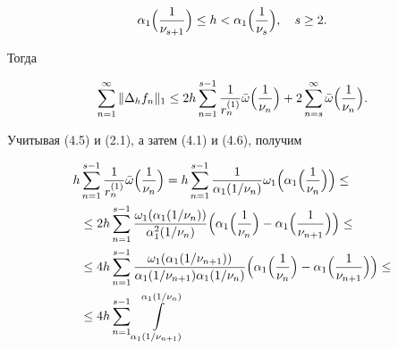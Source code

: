 \begin{pf}
\begin{equation} 


\alpha_1\Bigl(\frac{1}{\nu_{s+1}}\Bigr)\le h<\alpha_1 


\Bigl(\frac{1}{\nu_s}\Bigr),\quad s\ge 2. 


\end{equation} 


Тогда 


\begin{equation} 


\sum^\infty_{n=1}\|\Delta_h f_n\|_1\le 2h 


\sum^{s-1}_{n=1}\frac{1}{r_n^{(1)}}\Bar\omega\Bigl(\frac{1}{\nu_n}\Bigr) 


+2\sum^\infty_{n=s}\Bar\omega\Bigl(\frac{1}{\nu_n}\Bigr). 


\end{equation} 


Учитывая (4.5) и (2.1), а затем (4.1) и (4.6), получим 


\begin{align*} 


\allowdisplaybreaks[3]


h & \sum^{s-1}_{n=1}\frac{1}{r_n^{(1)}}\Bar\omega\Bigl(\frac{1}{\nu_n}\Bigr)= 


h\sum^{s-1}_{n=1}\frac{1}{\alpha_1(1/\nu_n)}\omega_1 


\Bigl(\alpha_1\Bigl(\frac{1}{\nu_n}\Bigr)\Bigr)\le \\ 


% 


& \le 2h\sum^{s-1}_{n=1}\frac{\omega_1(\alpha_1(1/\nu_n))} 


{\alpha_1^2(1/\nu_n)}\Bigl(\alpha_1\Bigl(\frac{1}{\nu_n}\Bigr)- 


\alpha_1\Bigl(\frac{1}{\nu_{n+1}}\Bigr)\Bigr) \le \\


% 


& \le 4h\sum^{s-1}_{n=1}\frac{\omega_1(\alpha_1(1/\nu_{n+1}))}


{\alpha_1(1/\nu_{n+1})\alpha_1(1/\nu_n)} 


\Bigl(\alpha_1\Bigl(\frac{1}{\nu_n}\Bigr)- 


\alpha_1\Bigl(\frac{1}{\nu_{n+1}}\Bigr)\Bigr) \le \\ 


% 


& \le 4h\sum^{s-1}_{n=1} 


\int\limits^{\alpha_1(1/\nu_n)}_{\alpha_1(1/\nu_{n+1})} 



\end{align*}
\end{pf}

